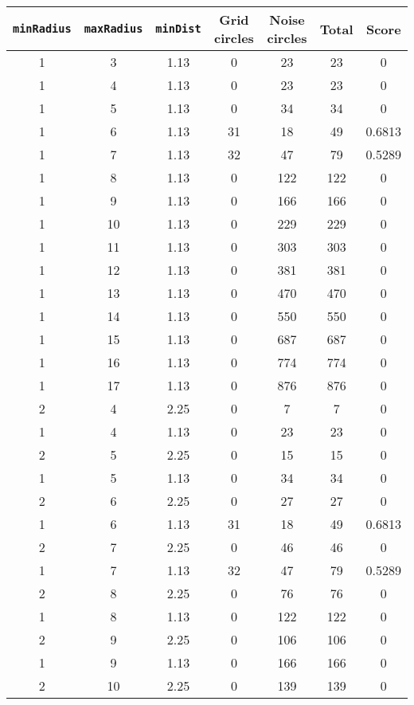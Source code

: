 \documentclass[letterpaper, 12pt]{article}
\begin{document}
\begin{longtable}{|c|c|c|c|c|c|c|}
\hline
\textbf{\texttt{minRadius}} & \textbf{\texttt{maxRadius}} & \textbf{\texttt{minDist}} & \textbf{Grid circles} & \textbf{Noise circles} & \textbf{Total} & \textbf{Score} \\
\hline
1 & 3 & 1.13 & 0 & 23 & 23 & 0 \\
\hline
1 & 4 & 1.13 & 0 & 23 & 23 & 0 \\
\hline
1 & 5 & 1.13 & 0 & 34 & 34 & 0 \\
\hline
1 & 6 & 1.13 & 31 & 18 & 49 & 0.6813 \\
\hline
1 & 7 & 1.13 & 32 & 47 & 79 & 0.5289 \\
\hline
1 & 8 & 1.13 & 0 & 122 & 122 & 0 \\
\hline
1 & 9 & 1.13 & 0 & 166 & 166 & 0 \\
\hline
1 & 10 & 1.13 & 0 & 229 & 229 & 0 \\
\hline
1 & 11 & 1.13 & 0 & 303 & 303 & 0 \\
\hline
1 & 12 & 1.13 & 0 & 381 & 381 & 0 \\
\hline
1 & 13 & 1.13 & 0 & 470 & 470 & 0 \\
\hline
1 & 14 & 1.13 & 0 & 550 & 550 & 0 \\
\hline
1 & 15 & 1.13 & 0 & 687 & 687 & 0 \\
\hline
1 & 16 & 1.13 & 0 & 774 & 774 & 0 \\
\hline
1 & 17 & 1.13 & 0 & 876 & 876 & 0 \\
\hline
2 & 4 & 2.25 & 0 & 7 & 7 & 0 \\
\hline
1 & 4 & 1.13 & 0 & 23 & 23 & 0 \\
\hline
2 & 5 & 2.25 & 0 & 15 & 15 & 0 \\
\hline
1 & 5 & 1.13 & 0 & 34 & 34 & 0 \\
\hline
2 & 6 & 2.25 & 0 & 27 & 27 & 0 \\
\hline
1 & 6 & 1.13 & 31 & 18 & 49 & 0.6813 \\
\hline
2 & 7 & 2.25 & 0 & 46 & 46 & 0 \\
\hline
1 & 7 & 1.13 & 32 & 47 & 79 & 0.5289 \\
\hline
2 & 8 & 2.25 & 0 & 76 & 76 & 0 \\
\hline
1 & 8 & 1.13 & 0 & 122 & 122 & 0 \\
\hline
2 & 9 & 2.25 & 0 & 106 & 106 & 0 \\
\hline
1 & 9 & 1.13 & 0 & 166 & 166 & 0 \\
\hline
2 & 10 & 2.25 & 0 & 139 & 139 & 0 \\

\end{longtable}
\end{document}
